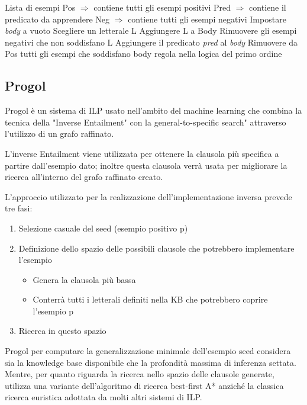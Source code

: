 \begin{algorithm}
	\begin{algorithmic}[1]
		\REQUIRE Lista di esempi
		\STATE Pos $\Rightarrow$ contiene tutti gli esempi positivi
		\STATE Pred $\Rightarrow$ contiene il predicato da apprendere
		\STATE Neg $\Rightarrow$ contiene tutti gli esempi negativi
		\STATE Impostare \textit{body} a vuoto
		\STATE Scegliere un letterale L
		\STATE Aggiungere L a Body
		\STATE Rimuovere gli esempi negativi che non soddisfano L
		\ENDWHILE
		\STATE Aggiungere il predicato \textit{pred} al \textit{body}
		\STATE Rimuovere da Pos tutti gli esempi che soddisfano body
		\ENDWHILE
		\ENDFOR
		\RETURN regola nella logica del primo ordine
	\end{algorithmic}
\end{algorithm}

\subsection{Progol}
Progol è un sistema di ILP usato nell'ambito del machine learning che combina la tecnica della "Inverse Entailment" con la general-to-specific search" attraverso l'utilizzo di un grafo raffinato. \cite{Muggleton1995}

L'inverse Entailment viene utilizzata per ottenere la clausola più specifica a partire dall'esempio dato; inoltre questa clausola verrà usata per migliorare la ricerca all'interno del grafo raffinato creato.

L'approccio utilizzato per la realizzazione dell'implementazione inversa prevede tre fasi:

\begin{enumerate}
\item Selezione casuale del seed (esempio positivo p)
\item Definizione dello spazio delle possibili clausole che potrebbero implementare l'esempio
	\begin{itemize}
		\item Genera la clausola più bassa
		\item Conterrà tutti i letterali definiti nella KB che potrebbero coprire l'esempio p
	\end{itemize}
\item Ricerca in questo spazio 
\end{enumerate}

Progol per computare la generalizzazione minimale dell'esempio seed considera sia la knowledge base disponibile che la profondità massima di inferenza settata. Mentre, per quanto riguarda la ricerca nello spazio delle clausole generate, utilizza una variante dell'algoritmo di ricerca best-first A* anziché la classica ricerca euristica adottata da molti altri sistemi di ILP.

